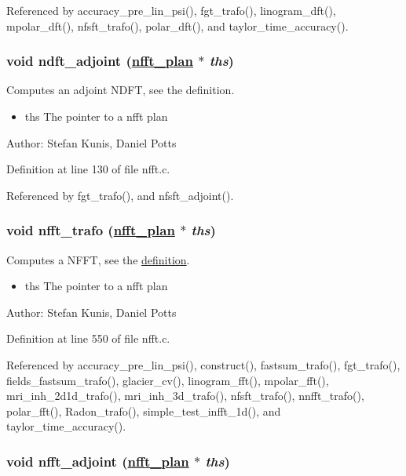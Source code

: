 Referenced by accuracy\_\-pre\_\-lin\_\-psi(), fgt\_\-trafo(), linogram\_\-dft(), mpolar\_\-dft(), nfsft\_\-trafo(), polar\_\-dft(), and taylor\_\-time\_\-accuracy().\hypertarget{group__nfft_ga1}{
\subsubsection[ndft\_\-adjoint]{\setlength{\rightskip}{0pt plus 5cm}void ndft\_\-adjoint (\hyperlink{structnfft__plan}{nfft\_\-plan} $\ast$ {\em ths})}}
\label{group__nfft_ga1}


Computes an adjoint NDFT, see the definition. 

\begin{itemize}
\item ths The pointer to a nfft plan\end{itemize}
\begin{Desc}
\item[Author:]Stefan Kunis, Daniel Potts \end{Desc}


Definition at line 130 of file nfft.c.

Referenced by fgt\_\-trafo(), and nfsft\_\-adjoint().\hypertarget{group__nfft_ga2}{
\subsubsection[nfft\_\-trafo]{\setlength{\rightskip}{0pt plus 5cm}void nfft\_\-trafo (\hyperlink{structnfft__plan}{nfft\_\-plan} $\ast$ {\em ths})}}
\label{group__nfft_ga2}


Computes a NFFT, see the \hyperlink{group__nfft_ndft_formula}{definition}. 

\begin{itemize}
\item ths The pointer to a nfft plan\end{itemize}
\begin{Desc}
\item[Author:]Stefan Kunis, Daniel Potts \end{Desc}


Definition at line 550 of file nfft.c.

Referenced by accuracy\_\-pre\_\-lin\_\-psi(), construct(), fastsum\_\-trafo(), fgt\_\-trafo(), fields\_\-fastsum\_\-trafo(), glacier\_\-cv(), linogram\_\-fft(), mpolar\_\-fft(), mri\_\-inh\_\-2d1d\_\-trafo(), mri\_\-inh\_\-3d\_\-trafo(), nfsft\_\-trafo(), nnfft\_\-trafo(), polar\_\-fft(), Radon\_\-trafo(), simple\_\-test\_\-infft\_\-1d(), and taylor\_\-time\_\-accuracy().\hypertarget{group__nfft_ga3}{
\subsubsection[nfft\_\-adjoint]{\setlength{\rightskip}{0pt plus 5cm}void nfft\_\-adjoint (\hyperlink{structnfft__plan}{nfft\_\-plan} $\ast$ {\em ths})}}
\label{group__nfft_ga3}


